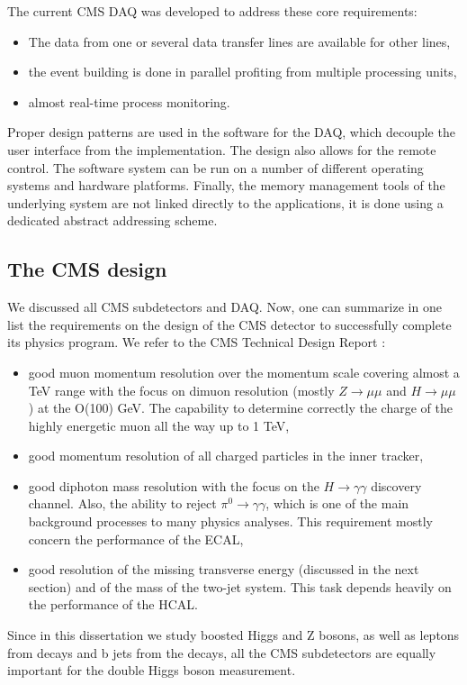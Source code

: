 \begin{normalsize}
The current CMS DAQ was developed to address these core requirements: 

\begin{itemize}
\item The data from one or several data transfer lines are available for other lines,
\item the event building is done in parallel profiting from multiple processing units,
\item almost real-time process monitoring.
\end{itemize}


Proper design patterns are used in the software for the DAQ, which decouple the user  interface from the implementation. The design also allows for the remote control. The  software  system  can be run on a number of different  operating  systems  and  hardware  platforms.   Finally, the memory  management  tools  of  the  underlying  system  are not linked directly to the applications, it is done using a dedicated abstract addressing  scheme.

  
\subsection{The CMS design}

We discussed all CMS subdetectors and DAQ. Now, one can summarize in one list the requirements on the design of the CMS detector to successfully complete its physics program. We refer to the CMS Technical Design Report \cite{CMS_TDR}: 

\begin{itemize}
\item good muon momentum resolution over the momentum scale covering almost a TeV range with the focus on dimuon resolution (mostly $Z \rightarrow \mu \mu$ and $H \rightarrow \mu \mu$) at the O(100) GeV. The capability to determine correctly the charge of the highly energetic muon all the way up to 1 TeV,
\item good momentum resolution of all charged particles in the inner tracker,
\item good diphoton mass resolution with the focus on the $H \rightarrow \gamma \gamma$ discovery channel. Also, the ability to reject $\pi^0 \rightarrow \gamma \gamma$, which is one of the main background processes to many physics analyses.  This requirement mostly concern the performance of the ECAL,
\item good resolution of the missing transverse energy (discussed in the next section) and of the mass of the two-jet system. This task depends heavily on the performance of the HCAL.
\end{itemize}

Since in this dissertation we study boosted Higgs and Z bosons, as well as leptons from \Zll decays and b jets from the \HBB decays, all the CMS subdetectors are equally important for the double Higgs boson measurement.



\end{normalsize}       %
 
